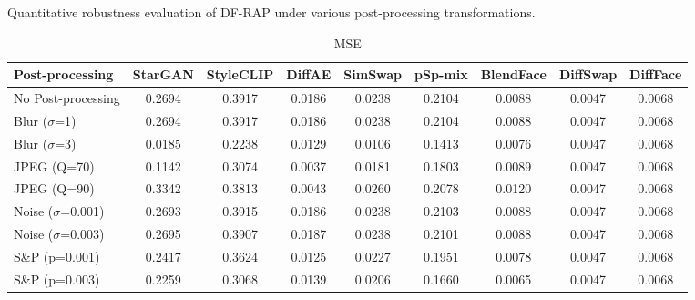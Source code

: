\documentclass{article}
\begin{document}
\begin{table}[h!]
\caption{Quantitative robustness evaluation of DF-RAP under various post-processing transformations.}
\label{tab:robust_df_rap}
\centering
\small

\begin{subtable}{\textwidth}
\caption{MSE}
\centering
\scriptsize
\begin{tabular}{lcccccccc}
\toprule
\textbf{Post-processing} & StarGAN & StyleCLIP & DiffAE & SimSwap & pSp-mix & BlendFace & DiffSwap & DiffFace \\
\midrule
No Post-processing & 0.2694 & 0.3917 & 0.0186 & 0.0238 & 0.2104 & 0.0088 & 0.0047 & 0.0068\\
\midrule
Blur ($\sigma$=1) & 0.2694 & 0.3917 & 0.0186 & 0.0238 & 0.2104 & 0.0088 & 0.0047 & 0.0068 \\
Blur ($\sigma$=3) & 0.0185 & 0.2238 & 0.0129 & 0.0106 & 0.1413 & 0.0076 & 0.0047 & 0.0068 \\
JPEG (Q=70) & 0.1142 & 0.3074 & 0.0037 & 0.0181 & 0.1803 & 0.0089 & 0.0047 & 0.0068 \\
JPEG (Q=90) & 0.3342 & 0.3813 & 0.0043 & 0.0260 & 0.2078 & 0.0120 & 0.0047 & 0.0068 \\
Noise ($\sigma$=0.001) & 0.2693 & 0.3915 & 0.0186 & 0.0238 & 0.2103 & 0.0088 & 0.0047 & 0.0068 \\
Noise ($\sigma$=0.003) & 0.2695 & 0.3907 & 0.0187 & 0.0238 & 0.2101 & 0.0088 & 0.0047 & 0.0068 \\
S\&P (p=0.001) & 0.2417 & 0.3624 & 0.0125 & 0.0227 & 0.1951 & 0.0078 & 0.0047 & 0.0068 \\
S\&P (p=0.003) & 0.2259 & 0.3068 & 0.0139 & 0.0206 & 0.1660 & 0.0065 & 0.0047 & 0.0068 \\
\bottomrule
\end{tabular}
\end{subtable}


\end{table}
\end{document}
